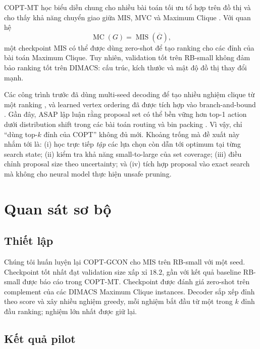 \documentclass[11pt,a4paper]{article}
\newcommand{\mc}{\operatorname{MC}}
\newcommand{\mis}{\operatorname{MIS}}
\begin{document}
COPT-MT học biểu diễn chung cho nhiều bài toán tối ưu tổ hợp trên đồ thị và cho thấy khả năng chuyển giao giữa MIS, MVC và Maximum Clique \citep{canturk2026copt}. Với quan hệ
\begin{equation}
    \mc(G)=\mis(\overline{G}),
\end{equation}
một checkpoint MIS có thể được dùng zero-shot để tạo ranking cho các đỉnh của bài toán Maximum Clique. Tuy nhiên, validation tốt trên RB-small không đảm bảo ranking tốt trên DIMACS: cấu trúc, kích thước và mật độ đồ thị thay đổi mạnh.

Các công trình trước đã dùng multi-seed decoding để tạo nhiều nghiệm clique từ một ranking \citep{min2022hybrid}, và learned vertex ordering đã được tích hợp vào branch-and-bound \citep{min2025ordering}. Gần đây, ASAP lập luận rằng proposal set có thể bền vững hơn top-1 action dưới distribution shift trong các bài toán routing và bin packing \citep{fang2026asap}. Vì vậy, chỉ ``dùng top-$k$ đỉnh của COPT'' không đủ mới. Khoảng trống mà đề xuất này nhắm tới là: (i) học trực tiếp \emph{tập} các lựa chọn còn dẫn tới optimum tại từng search state; (ii) kiểm tra khả năng small-to-large của set coverage; (iii) điều chỉnh proposal size theo uncertainty; và (iv) tích hợp proposal vào exact search mà không cho neural model thực hiện unsafe pruning.

\section{Quan sát sơ bộ}

\subsection{Thiết lập}

Chúng tôi huấn luyện lại COPT-GCON cho MIS trên RB-small với một seed. Checkpoint tốt nhất đạt validation size xấp xỉ $18.2$, gần với kết quả baseline RB-small được báo cáo trong COPT-MT. Checkpoint được đánh giá zero-shot trên complement của các DIMACS Maximum Clique instances. Decoder sắp xếp đỉnh theo score và xây nhiều nghiệm greedy, mỗi nghiệm bắt đầu từ một trong $k$ đỉnh đầu ranking; nghiệm lớn nhất được giữ lại.

\subsection{Kết quả pilot}
\end{document}
